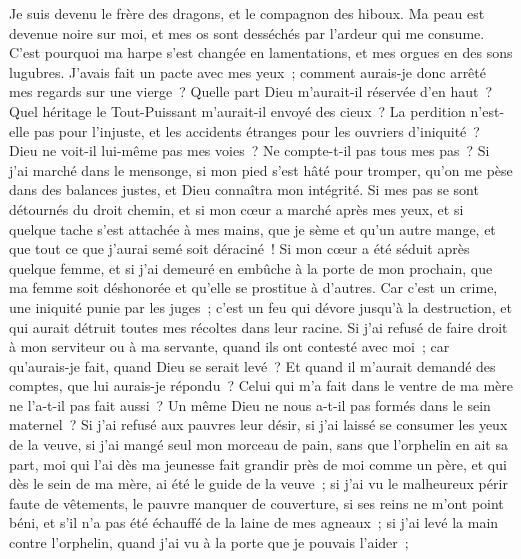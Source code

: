 \begin{multicols}{2}
Je suis devenu le frère des dragons, et le compagnon des hiboux.
Ma peau est devenue noire sur moi, et mes os sont desséchés par l'ardeur qui me consume.
C'est pourquoi ma harpe s'est changée en lamentations, et mes orgues en des sons lugubres.
\VerseOne{}J'avais fait un pacte avec mes yeux~; comment aurais-je donc arrêté mes regards sur une vierge~?
Quelle part Dieu m'aurait-il réservée d'en haut~? Quel héritage le Tout-Puissant m'aurait-il envoyé des cieux~?
La perdition n'est-elle pas pour l'injuste, et les accidents étranges pour les ouvriers d'iniquité~?
Dieu ne voit-il lui-même pas mes voies~? Ne compte-t-il pas tous mes pas~?
Si j'ai marché dans le mensonge, si mon pied s'est hâté pour tromper,
qu'on me pèse dans des balances justes, et Dieu connaîtra mon intégrité.
Si mes pas se sont détournés du droit chemin, et si mon cœur a marché après mes yeux, et si quelque tache s'est attachée à mes mains,
que je sème et qu'un autre mange, et que tout ce que j'aurai semé soit déraciné~!
Si mon cœur a été séduit après quelque femme, et si j'ai demeuré en embûche à la porte de mon prochain,
que ma femme soit déshonorée et qu'elle se prostitue à d'autres.
Car c'est un crime, une iniquité punie par les juges~;
c'est un feu qui dévore jusqu'à la destruction, et qui aurait détruit toutes mes récoltes dans leur racine.
Si j'ai refusé de faire droit à mon serviteur ou à ma servante, quand ils ont contesté avec moi~;
car qu'aurais-je fait, quand Dieu se serait levé~? Et quand il m'aurait demandé des comptes, que lui aurais-je répondu~?
Celui qui m'a fait dans le ventre de ma mère ne l'a-t-il pas fait aussi~? Un même Dieu ne nous a-t-il pas formés dans le sein maternel~?
Si j'ai refusé aux pauvres leur désir, si j'ai laissé se consumer les yeux de la veuve,
si j'ai mangé seul mon morceau de pain, sans que l'orphelin en ait sa part,
moi qui l'ai dès ma jeunesse fait grandir près de moi comme un père, et qui dès le sein de ma mère, ai été le guide de la veuve~;
si j'ai vu le malheureux périr faute de vêtements, le pauvre manquer de couverture,
si ses reins ne m'ont point béni, et s'il n'a pas été échauffé de la laine de mes agneaux~;
si j'ai levé la main contre l'orphelin, quand j'ai vu à la porte que je pouvais l'aider~;

\end{multicols}

